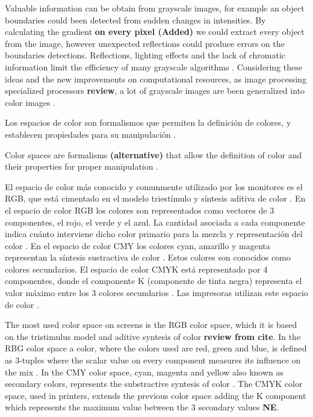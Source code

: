 Valuable information can be obtain from grayscale images, for example an object boundaries could been detected from sudden changes in intensities. By calculating the gradient \textbf{on every pixel (Added)} we could extract every object from the image, however unexpected reflections could produce errors on the boundaries detections. Reflections, lighting effects and the lack of chromatic information limit the efficiency of many grayscale algorithms \cite{ortiz2002procesamiento}. Considering these ideas and the new improvements on computational resources, as image processing specialized processors \textbf{review}, a lot of grayscale images are been generalized into color images \cite{ortiz2002procesamiento}.
  
Los espacios de color son formalismos que permiten la definici\'on de colores, y establecen propiedades para su manipulaci\'on \cite{joblove1978color,meyer1980perceptual}.

Color spaces are formalisms \textbf{(alternative)} that allow the definition of color and their properties for proper manipulation \cite{joblove1978colo,meyer1980perceptual}.

El espacio de color m\'as conocido y comunmente utilizado por los monitores es el RGB, que est\'a cimentado en el modelo triest\'imulo y s\'intesis aditiva de color \cite{busin2008color}. En el espacio de color RGB los colores son representados como vectores de 3 componentes, el rojo, el verde y el azul. La cantidad asociada a cada componente indica cu\'anto interviene dicho color primario para la mezcla y representaci\'on del color \cite{tkalcic2003colour}. En el espacio de color CMY los colores cyan, amarillo y magenta  representan la s\'intesis sustractiva de color \cite{rolleston1996color}.  Estos colores son conocidos como colores secundarios. El espacio de color CMYK est\'a representado por 4 componentes, donde el componente K (componente de tinta negra) representa el valor m\'aximo entre los 3 colores secundarios \cite{tkalcic2003colour}. Las impresoras utilizan este espacio de color \cite{rolleston1996color}.

The most used color space on screens is the RGB color space, which it is based on the tristimulus model and aditive syntesis of color \textbf{review from cite}. In the RBG color space a color, where the colors used are red, green and blue, is defined as 3-tuples where the scalar value on every component measures its influence on the mix \cite{tkalcic2003colour}. In the CMY color space, cyan, magenta and yellow also known as secondary colors, represents the substractive syntesis of color \cite{rolleston1996color}. The CMYK color space, used in printers\cite{rolleston1996color}, extends the previous color space adding the K component which represents the maximum value between the 3 secondary values\cite{tkalcic2003colour} \textbf{NE}.

